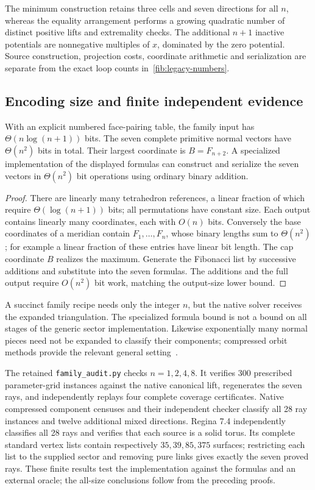 The minimum construction retains three cells and seven directions for
all \(n\), whereas the equality arrangement performs a growing
quadratic number of distinct positive lifts and extremality checks.
The additional \(n+1\) inactive potentials are nonnegative multiples
of \(x\), dominated by the zero potential.  Source construction,
projection costs, coordinate arithmetic and serialization are separate
from the exact loop counts in~\eqref{fib:legacy-numbers}.

\subsection{Encoding size and finite independent evidence}
\label{fib:encoding}

\begin{proposition}
\label{fib:bits}
With an explicit numbered face-pairing table, the family input has
\(\Theta(n\log(n+1))\) bits.  The seven complete primitive normal
vectors have \(\Theta(n^2)\) bits in total.  Their largest coordinate
is \(B=F_{n+2}\).  A specialized implementation of the displayed
formulas can construct and serialize the seven vectors in
\(\Theta(n^2)\) bit operations using ordinary binary addition.
\end{proposition}
\begin{proof}
There are linearly many tetrahedron references, a linear fraction of
which require \(\Theta(\log(n+1))\) bits; all permutations have
constant size.  Each output contains linearly many coordinates, each
with \(O(n)\) bits.  Conversely the base coordinates of a meridian
contain \(F_1,\ldots,F_n\), whose binary lengths sum to
\(\Theta(n^2)\); for example a linear fraction of these entries have
linear bit length.  The cap coordinate \(B\) realizes the maximum.
Generate the Fibonacci list by successive additions and substitute into
the seven formulas.  The additions and the full output require
\(O(n^2)\) bit work, matching the output-size lower bound.
\end{proof}

A succinct family recipe needs only the integer \(n\), but the native
solver receives the expanded triangulation.  The specialized formula
bound is not a bound on all stages of the generic sector implementation.
Likewise exponentially many normal pieces need not be expanded to
classify their components; compressed orbit methods provide the relevant
general setting~\cite{AHT2006}.

The retained \texttt{family\_audit.py} checks \(n=1,2,4,8\).
It verifies 300 prescribed parameter-grid instances against the native
canonical lift, regenerates the seven rays, and independently replays
four complete coverage certificates.  Native compressed component
censuses and their independent checker classify all 28 ray instances
and twelve additional mixed directions.  Regina 7.4 independently
classifies all 28 rays and verifies that each source is a solid torus.
Its complete standard vertex lists contain respectively
\(35,39,85,375\) surfaces; restricting each list to the supplied sector
and removing pure links gives exactly the seven proved rays.
These finite results test the implementation against the formulas and
an external oracle; the all-size conclusions follow from the preceding
proofs.
